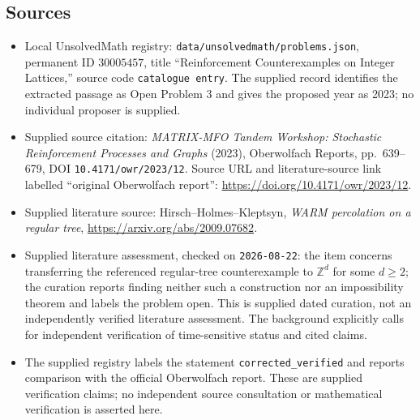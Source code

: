 \documentclass[11pt]{article}
\newcommand{\Z}{\mathbb{Z}}
\begin{document}
\subsection{Sources}
\begin{itemize}
\item Local UnsolvedMath registry: \texttt{data/unsolvedmath/problems.json}, permanent ID \(30005457\), title ``Reinforcement Counterexamples on Integer Lattices,'' source code \texttt{catalogue entry}. The supplied record identifies the extracted passage as Open Problem 3 and gives the proposed year as 2023; no individual proposer is supplied.
\item Supplied source citation: \emph{MATRIX-MFO Tandem Workshop: Stochastic Reinforcement Processes and Graphs} (2023), Oberwolfach Reports, pp.\ 639--679, DOI \texttt{10.4171/owr/2023/12}. Source URL and literature-source link labelled ``original Oberwolfach report'': \url{https://doi.org/10.4171/owr/2023/12}.
\item Supplied literature source: Hirsch--Holmes--Kleptsyn, \emph{WARM percolation on a regular tree}, \url{https://arxiv.org/abs/2009.07682}.
\item Supplied literature assessment, checked on \texttt{2026-08-22}: the item concerns transferring the referenced regular-tree counterexample to \(\Z^d\) for some \(d\geq 2\); the curation reports finding neither such a construction nor an impossibility theorem and labels the problem open. This is supplied dated curation, not an independently verified literature assessment. The background explicitly calls for independent verification of time-sensitive status and cited claims.
\item The supplied registry labels the statement \texttt{corrected\_verified} and reports comparison with the official Oberwolfach report. These are supplied verification claims; no independent source consultation or mathematical verification is asserted here.
\end{itemize}
\end{document}
